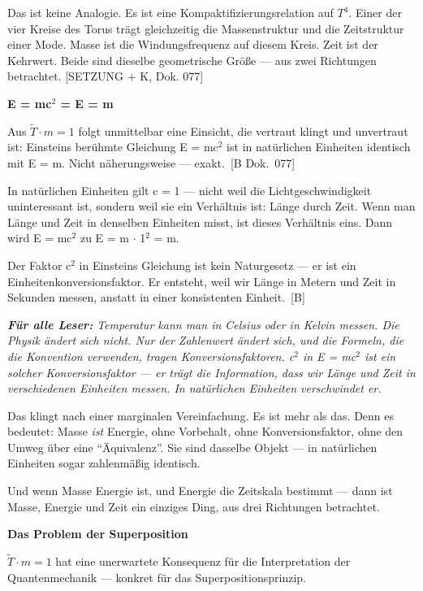 \documentclass[11pt,oneside]{book}
\newcommand{\status}[1]{\penalty10000\,{\scriptsize\textcolor{gray!60}{[#1]}}}
\newenvironment{laierspur}{%
  \par\vspace{4pt}%
  \noindent\small\itshape\color{blue!60!black}%
  \textbf{Für alle Leser:}\enspace\ignorespaces}{%
  \par\vspace{4pt}\normalsize\normalfont\normalcolor}
\begin{document}
Das ist keine Analogie. Es ist eine Kompaktifizierungsrelation auf $T^4$.
Einer der vier Kreise des Torus trägt gleichzeitig die Massenstruktur und
die Zeitstruktur einer Mode. Masse ist die Windungsfrequenz auf diesem
Kreis. Zeit ist der Kehrwert. Beide sind dieselbe geometrische Größe —
aus zwei Richtungen betrachtet. [SETZUNG + K, Dok. 077]


\textbf{E = mc$^2$ = E = m}


Aus $\tilde{T}\cdot m = 1$ folgt unmittelbar eine Einsicht, die vertraut klingt
und unvertraut ist: Einsteins berühmte Gleichung E = mc$^2$ ist in natürlichen
Einheiten identisch mit E = m. Nicht näherungsweise — exakt. \status{B Dok.~077}


In natürlichen Einheiten gilt c = 1 — nicht weil die Lichtgeschwindigkeit
uninteressant ist, sondern weil sie ein Verhältnis ist: Länge durch Zeit.
Wenn man Länge und Zeit in denselben Einheiten misst, ist dieses Verhältnis
eins. Dann wird E = mc$^2$ zu E = m $\cdot$ 1$^2$ = m.


Der Faktor c$^2$ in Einsteins Gleichung ist kein Naturgesetz — er ist ein
Einheitenkonversionsfaktor. Er entsteht, weil wir Länge in Metern und
Zeit in Sekunden messen, anstatt in einer konsistenten Einheit. \status{B}


\begin{laierspur}
Temperatur kann man in Celsius oder in Kelvin messen. Die
Physik ändert sich nicht. Nur der Zahlenwert ändert sich, und die
Formeln, die die Konvention verwenden, tragen Konversionsfaktoren.
c$^2$ in E = mc$^2$ ist ein solcher Konversionsfaktor — er trägt die
Information, dass wir Länge und Zeit in verschiedenen Einheiten messen.
In natürlichen Einheiten verschwindet er.
\end{laierspur}

Das klingt nach einer marginalen Vereinfachung. Es ist mehr als das. Denn
es bedeutet: Masse \textit{ist} Energie, ohne Vorbehalt, ohne Konversionsfaktor,
ohne den Umweg über eine \enquote{Äquivalenz}. Sie sind dasselbe Objekt — in
natürlichen Einheiten sogar zahlenmäßig identisch.


Und wenn Masse Energie ist, und Energie die Zeitskala bestimmt — dann
ist Masse, Energie und Zeit ein einziges Ding, aus drei Richtungen
betrachtet.


\textbf{Das Problem der Superposition}


$\tilde{T}\cdot m = 1$ hat eine unerwartete Konsequenz für die Interpretation der
Quantenmechanik — konkret für das Superpositionsprinzip.
\end{document}
